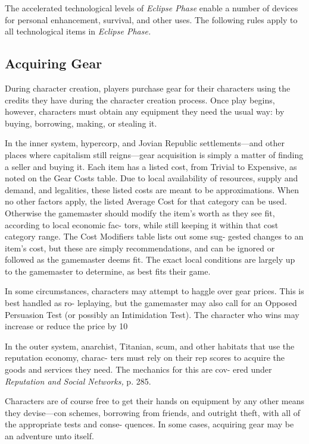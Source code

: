 

The accelerated technological levels of \textit{Eclipse Phase}
enable a number of devices for personal enhancement, 
survival, and other uses.
The following rules apply to all technological items in 
\textit{Eclipse Phase.}

\subsection{Acquiring Gear}

During character creation, players purchase gear for 
their characters using the credits they have during 
the character creation process. Once play begins, 
however, characters must obtain any equipment they 
need the usual way: by buying, borrowing, making, 
or stealing it.

In the inner system, hypercorp, and Jovian Republic 
settlements—and other places where capitalism still 
reigns—gear acquisition is simply a matter of finding 
a seller and buying it. Each item has a listed cost, from 
Trivial to Expensive, as noted on the Gear Costs table. 
Due to local availability of resources, supply and 
demand, and legalities, these listed costs are meant 
to be approximations. When no other factors apply, 
the listed Average Cost for that category can be used. 
Otherwise the gamemaster should modify the item's 
worth as they see fit, according to local economic fac-
tors, while still keeping it within that cost category 
range. The Cost Modifiers table lists out some sug-
gested changes to an item's cost, but these are simply 
recommendations, and can be ignored or followed as 
the gamemaster deems fit. The exact local conditions 
are largely up to the gamemaster to determine, as best 
fits their game.

In some circumstances, characters may attempt to 
haggle over gear prices. This is best handled as ro-
leplaying, but the gamemaster may also call for an 
Opposed Persuasion Test (or possibly an Intimidation 
Test). The character who wins may increase or reduce 
the price by 10%

In the outer system, anarchist, Titanian, scum, and 
other habitats that use the reputation economy, charac-
ters must rely on their rep scores to acquire the goods 
and services they need. The mechanics for this are cov-
ered under \textit{Reputation and Social Networks,} p. 285.

Characters are of course free to get their hands 
on equipment by any other means they devise—con 
schemes, borrowing from friends, and outright 
theft, with all of the appropriate tests and conse-
quences. In some cases, acquiring gear may be an 
adventure unto itself.

